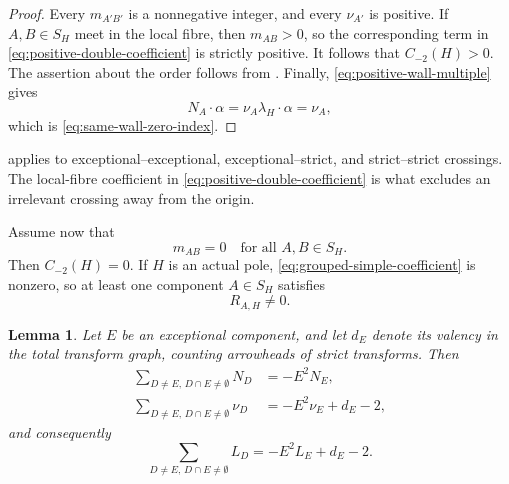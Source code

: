 \documentclass[12pt]{amsart}
\numberwithin{equation}{section}
\theoremstyle{plain}
\newtheorem{lemma}[theorem]{Lemma}
\theoremstyle{definition}
\theoremstyle{remark}
\theoremstyle{definition}
\begin{document}
\begin{proof}
Every $m_{A'B'}$ is a nonnegative integer, and every $\nu_{A'}$ is positive. If $A,B\in S_H$ meet in the local fibre, then $m_{AB}>0$, so the corresponding term in \eqref{eq:positive-double-coefficient} is strictly positive. It follows that $C_{-2}(H)>0$. The assertion about the order follows from . Finally, \eqref{eq:positive-wall-multiple} gives
\[
 N_A\cdot\alpha
 =
 \nu_A\lambda_H\cdot\alpha
 =
 \nu_A,
\]
which is \eqref{eq:same-wall-zero-index}.
\end{proof}

 applies to exceptional--exceptional, exceptional--strict, and strict--strict crossings. The local-fibre coefficient in \eqref{eq:positive-double-coefficient} is what excludes an irrelevant crossing away from the origin.


Assume now that
\begin{equation}\label{eq:no-same-wall-edge}
 m_{AB}=0
 \quad\text{for all }A,B\in S_H.
\end{equation}
Then $C_{-2}(H)=0$. If $H$ is an actual pole,
\eqref{eq:grouped-simple-coefficient} is nonzero, so at least one component
$A\in S_H$ satisfies
\begin{equation}\label{eq:selected-component}
 R_{A,H}\ne0.
\end{equation}



\begin{lemma}\label{lem:exceptional-neighbour-identities}
Let $E$ be an exceptional component, and let $d_E$ denote its valency in the total transform graph, counting arrowheads of strict transforms. Then
\begin{align}
 \sum_{D\neq E,\, D\cap E\neq \emptyset}N_D&=-E^2N_E,
 \label{eq:principal-neighbour-identity}\\
 \sum_{D\neq E,\, D\cap E\neq \emptyset}\nu_D&=-E^2\nu_E+d_E-2,
 \label{eq:adjunction-neighbour-identity}
\end{align}
and consequently
\begin{equation}\label{eq:affine-neighbour-identity}
 \sum_{D\neq E,\, D\cap E\neq \emptyset}L_D=-E^2L_E+d_E-2.
\end{equation}
\end{lemma}
\end{document}
